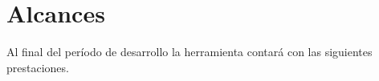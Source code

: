 \documentclass[11pt,letterpaper]{article}
\begin{document}
\section{Alcances}
Al final del período de desarrollo la herramienta contará con las siguientes prestaciones.
\end{document}
